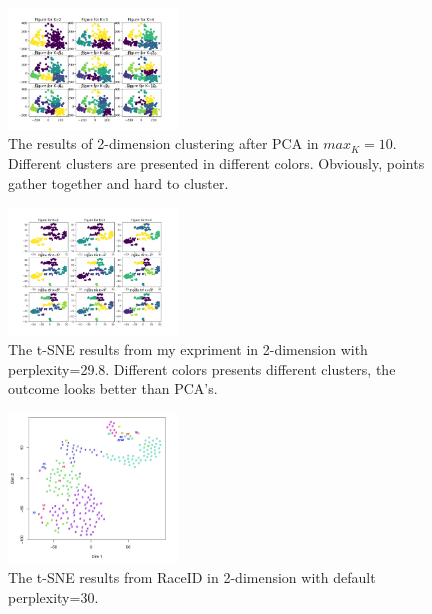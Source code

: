 \documentclass[10pt,journal]{IEEEtran}
\begin{document}
 



\begin{figure}[H] 
\centering
\includegraphics[width=0.4\textwidth]{fig2/pca.png} 
\caption{The results of 2-dimension clustering after PCA in \(max_K=10\). Different clusters are presented in different colors. Obviously, points gather together and hard to cluster. } 
\label{Fig.6}
\end{figure}


\begin{figure}[H] 
\centering
\includegraphics[width=0.4\textwidth]{fig2/tsne.png} 
\caption{ The t-SNE results from my expriment in 2-dimension with perplexity=29.8.  Different colors presents different clusters, the outcome looks better than PCA's. } 
\label{Fig.7}
\end{figure}

\begin{figure}[H] 
\centering
\includegraphics[width=0.4\textwidth]{fig2/tsne2.png} 
\caption{The t-SNE results from RaceID in 2-dimension with default perplexity=30.} 
\label{Fig.8}
\end{figure}
\end{document}
